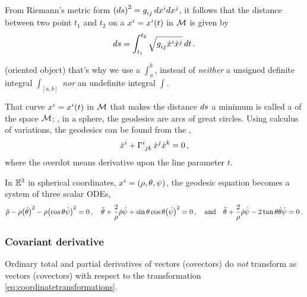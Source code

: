 From Riemann's metric form $\sqlinelem = \tcovmet ij\,d\tvec\pos i d\tvec\pos j$, it follows that the distance between two point $t_1$ and $t_2$ on a  $\tvec\pos i = \tvec\pos i\vat t$ in $\manifold M$ is given by
%
\begin{equation*}
  \linelem = \int_{t_1}^{t_2}\sqrt{\tcovmet ij\tvec{\dt\pos}{i}\tvec{\dt\pos}{j}}\,dt\,.
\end{equation*}

\begin{note}
   (oriented object) that's why we use a  $\int_a^b$, instead of \emph{neither} a unsigned definite integral $\int_{[a,b]}$ \emph{nor} an undefinite integral $\int$.
\end{note}

That curve $\tvec\pos i = \tvec\pos i\vat t$ in $\manifold M$ that makes the distance $ds$ a minimum is called a  of the space $\manifold M$; \eg, in a sphere, the geodesics are arcs of great circles. Using calculus of variations, the geodesics can be found from the ,
%
\begin{equation}\label{eq:geodesicequation}
    \tvec{\ddt\pos}{i} + \skchris ijk\,\tvec{\dt\pos}j\tvec{\dt\pos}k = 0\,,
\end{equation}
%
where the overdot means derivative upon the line parameter $t$.

\begin{example}
  In $\mathbb{E}^{3}$ in spherical coordinates, $\tvec\pos i = \tuple{\sxpos,\sypos,\szpos}$, the geodesic equation becomes a system of three scalar ODEs,
  \begin{equation}\label{eq:componentsaccelerationsphericalcoordinates}
    \ddt\sxpos - \sxpos\parens{\dt\sypos}^2 - \sxpos\parens{\cos\sypos\dt\szpos}^2 = 0\,,\quad
    \ddt\sypos + \dfrac{2}{\sxpos}\dt\sxpos\dt\szpos + \sin\sypos\cos\sypos\parens{\dt\szpos}^2 = 0\,,\quad\text{and}\quad
    \ddt\sypos + \dfrac{2}{\sxpos}\dt\sxpos\dt\szpos - 2\tan\sypos\dt\sypos\dt\szpos = 0\,.
  \end{equation}
\end{example}


\subsubsection{Covariant derivative}
%
Ordinary total and partial derivatives of vectors (covectors) do \emph{not} transform as vectors (covectors) with respect to the transformation \cref{eq:coordinatetransformations}.

